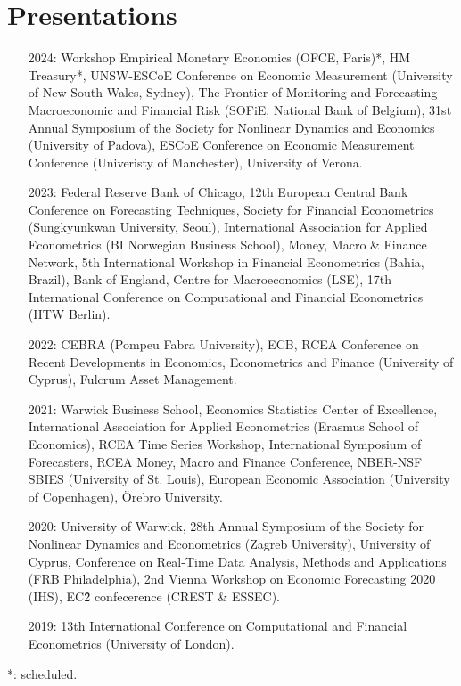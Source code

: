 \documentclass[a4paper,12pt]{article}
\begin{document}
\section{Presentations}
\begin{itemize}
    \item[2024:] Workshop Empirical Monetary Economics (OFCE, Paris)*, HM Treasury*, UNSW-ESCoE Conference on Economic Measurement (University of New South Wales, Sydney), The Frontier of Monitoring and Forecasting Macroeconomic and Financial Risk (SOFiE, National Bank of Belgium), 31st Annual Symposium of the Society for Nonlinear Dynamics and Economics (University of Padova), ESCoE Conference on Economic Measurement Conference (Univeristy of Manchester), University of Verona.
    \item[2023:] Federal Reserve Bank of Chicago, 12th European Central Bank Conference on Forecasting Techniques, Society for Financial Econometrics (Sungkyunkwan University, Seoul), International Association for Applied Econometrics (BI Norwegian Business School), Money, Macro \& Finance Network, 5th International Workshop in Financial Econometrics (Bahia, Brazil), Bank of England, Centre for Macroeconomics (LSE), 17th International Conference on Computational and Financial Econometrics (HTW Berlin). 
    \item[2022:] CEBRA (Pompeu Fabra University), ECB, RCEA Conference on Recent Developments in Economics, Econometrics and Finance (University of Cyprus), Fulcrum Asset Management.
    \item[2021:] Warwick Business School, Economics Statistics Center of Excellence, International Association for Applied Econometrics (Erasmus School of Economics),  RCEA Time Series Workshop, International Symposium of Forecasters,  RCEA Money, Macro and Finance Conference, NBER-NSF SBIES (University of St. Louis), European Economic Association (University of Copenhagen), \"Orebro University.
    \item[2020:] University of Warwick, 28th Annual Symposium of the Society for Nonlinear Dynamics and Econometrics (Zagreb University), University of Cyprus, Conference on Real-Time Data Analysis, Methods and Applications (FRB Philadelphia), 2nd Vienna Workshop on Economic Forecasting 2020 (IHS), EC\^2 confecerence (CREST \& ESSEC).
    \item[2019:] 13th International Conference on Computational and Financial Econometrics (University of London).
\end{itemize}
*: scheduled.
\end{document}
